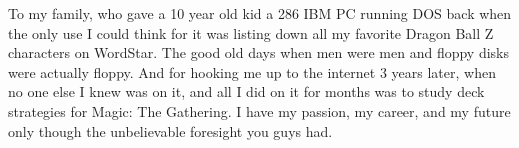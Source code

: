 
\vspace*{7cm}

To my family, who gave a 10 year old kid a 286 IBM PC running DOS back when the only use I could think for it was listing down all my favorite Dragon Ball Z characters on WordStar. The good old days when men were men and floppy disks were actually floppy. And for hooking me up to the internet 3 years later, when no one else I knew was on it, and all I did on it for months was to study deck strategies for Magic: The Gathering. I have my passion, my career, and my future only though the unbelievable foresight you guys had.




